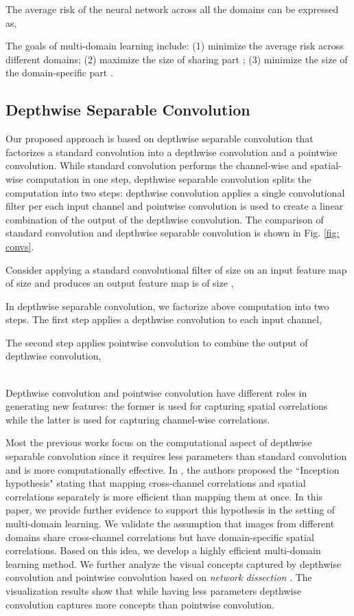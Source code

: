 \documentclass[letterpaper]{article} \usepackage{aaai19}  \usepackage{times}  \usepackage{helvet}  \usepackage{courier}  \usepackage{url}  \usepackage{graphicx}  \usepackage{amssymb}
\begin{document}
The average risk of the neural network across all the domains can be expressed as,

The goals of multi-domain learning include: (1) minimize the average risk across different domains; (2) maximize the size of sharing part ; (3) minimize the size of the domain-specific part .

\subsection{Depthwise Separable Convolution}
Our proposed approach is based on depthwise separable convolution that factorizes a standard  convolution into a  depthwise
convolution and a  pointwise convolution. While standard convolution performs the channel-wise and spatial-wise computation in one step, depthwise separable convolution splits the computation into two steps: depthwise convolution applies a single convolutional filter per each input channel and pointwise convolution is used to create a linear combination of the output of the depthwise convolution. The comparison of standard convolution and depthwise separable convolution is shown in Fig. \ref{fig: convs}.

Consider applying a standard convolutional filter  of size  on an input feature map  of size  and produces an output feature map  is of size ,



In depthwise separable convolution, we factorize above computation into two steps. The first step applies a  depthwise
convolution  to each input channel,


The second step applies  pointwise
convolution  to combine the output of depthwise convolution,


\\

Depthwise convolution and pointwise convolution have different roles in generating new features: the former is used for capturing spatial correlations while the latter is used for capturing channel-wise correlations.

Most the previous works \cite{chollet2017xception,howard2017mobilenets,sandler2018inverted} focus on the computational aspect of depthwise separable convolution since it requires less parameters than standard convolution and is more computationally effective. In \cite{chollet2017xception}, the authors proposed the ``Inception hypothesis" stating that mapping cross-channel correlations and spatial correlations separately is more efficient than mapping them at once. In this paper, we provide further evidence to support this hypothesis in the setting of multi-domain learning. We validate the assumption that images from different domains share cross-channel correlations but have domain-specific spatial correlations. Based on this idea, we develop a highly efficient multi-domain learning method. We further analyze the visual concepts captured by depthwise convolution and pointwise convolution based on \textit{network dissection} \cite{bau2017network}. The visualization results show that while having less parameters depthwise convolution captures more concepts than pointwise convolution.
 
\end{document}
